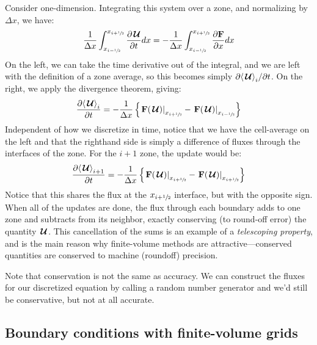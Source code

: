 Consider one-dimension.
Integrating this system over a zone, and normalizing by $\Delta x$, we have:
\begin{equation}
\frac{1}{\Delta x} \int_{x_{i-{\sfrac{1}{2}}}}^{x_{i+{\sfrac{1}{2}}}} {\frac{{\partial{\,\boldsymbol{\mathcal{U}}}}}{\partial t}} dx =
  -\frac{1}{\Delta x} \int_{x_{i-{\sfrac{1}{2}}}}^{x_{i+{\sfrac{1}{2}}}} \frac{\partial {\bf F}}{\partial x} dx
\end{equation}
On the left, we can take the time derivative out of the integral, and
we are left with the definition of a zone average, so this becomes
simply $\partial {\langle {\,\boldsymbol{\mathcal{U}}}\rangle}_i/\partial t$.  On the right, we
apply the divergence theorem, giving:
\begin{equation}
\frac{\partial {\langle {\,\boldsymbol{\mathcal{U}}}\rangle}_i}{\partial t} =
  - \frac{1}{\Delta x} \left \{ \left . {\bf F}({\,\boldsymbol{\mathcal{U}}}) \right |_{x_{i+{\sfrac{1}{2}}}} -
                                \left . {\bf F}({\,\boldsymbol{\mathcal{U}}}) \right |_{x_{i-{\sfrac{1}{2}}}} \right \}
\end{equation}
Independent of how we discretize in time, notice that we have the cell-average
on the left and that the righthand side
is simply a difference of fluxes through the interfaces of the zone.
For the $i+1$ zone, the update would be:
\begin{equation}
\label{eq:consup}
\frac{\partial {\langle {\,\boldsymbol{\mathcal{U}}}\rangle}_{i+1}}{\partial t} =
  - \frac{1}{\Delta x} \left \{ \left . {\bf F}({\,\boldsymbol{\mathcal{U}}}) \right |_{x_{i+\sfrac{3}{2}}} -
                                \left . {\bf F}({\,\boldsymbol{\mathcal{U}}}) \right |_{x_{i+{\sfrac{1}{2}}}} \right \}
\end{equation}
Notice that this shares the flux at the $x_{i+{\sfrac{1}{2}}}$ interface, but with the
opposite sign.   When all of the updates are done, the flux through each
boundary adds to one zone and subtracts from its neighbor, exactly conserving
(to round-off error) the quantity ${\,\boldsymbol{\mathcal{U}}}$.  This cancellation of the sums
is an example of a {\em telescoping property}, and is the main reason
why finite-volume methods are attractive---conserved quantities are
conserved to machine (roundoff) precision.

Note that conservation is not the same as accuracy.  We can construct
the fluxes for our discretized equation by calling a random number
generator and we'd still be conservative, but not at all accurate.

\subsection{Boundary conditions with finite-volume grids}

\label{sec:fv:bcs}

